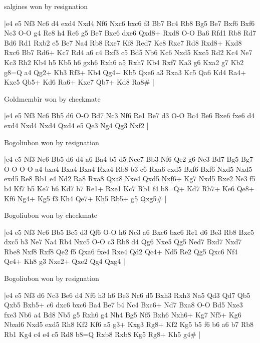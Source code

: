\showboard

salgines won by resignation

\makegametitle
|e4 e5 Nf3 Nc6 d4 exd4 Nxd4 Nf6 Nxc6 bxc6 f3 Bb7 Bc4 Rb8 Bg5 Be7 Bxf6 Bxf6 Nc3 O-O g4 Re8 h4 Re6 g5 Be7 Bxe6 dxe6 Qxd8+ Rxd8 O-O Ba6 Rfd1 Rb8 Rd7 Bd6 Rd1 Rxb2 e5 Be7 Na4 Rb8 Rxe7 Kf8 Red7 Ke8 Rxc7 Rd8 Rxd8+ Kxd8 Rxc6 Bb7 Rd6+ Kc7 Rd4 a6 c4 Bxf3 c5 Bd5 Nb6 Kc6 Nxd5 Kxc5 Rd2 Kc4 Ne7 Kc3 Rh2 Kb4 h5 Kb5 h6 gxh6 Rxh6 a5 Rxh7 Kb4 Rxf7 Ka3 g6 Kxa2 g7 Kb2 g8=Q a4 Qg2+ Kb3 Rf3+ Kb4 Qg4+ Kb5 Qxe6 a3 Rxa3 Kc5 Qa6 Kd4 Ra4+ Kxe5 Qb5+ Kd6 Ra6+ Kxe7 Qb7+ Kd8 Ra8\#  |

\showboard

Goldmembir won by checkmate

\makegametitle
|e4 e5 Nf3 Nc6 Bb5 d6 O-O Bd7 Nc3 Nf6 Re1 Be7 d3 O-O Bc4 Be6 Bxe6 fxe6 d4 exd4 Nxd4 Nxd4 Qxd4 e5 Qe3 Ng4 Qg3 Nxf2  |

\showboard

Bogoliubon won by resignation

\makegametitle
|e4 e5 Nf3 Nc6 Bb5 d6 d4 a6 Ba4 b5 d5 Nce7 Bb3 Nf6 Qe2 g6 Nc3 Bd7 Bg5 Bg7 O-O O-O a4 bxa4 Bxa4 Bxa4 Rxa4 Rb8 b3 c6 Rxa6 cxd5 Bxf6 Bxf6 Nxd5 Nxd5 exd5 Re8 Rb1 e4 Nd2 Ra8 Rxa8 Qxa8 Nxe4 Qxd5 Nxf6+ Kg7 Nxd5 Rxe2 Ne3 f5 b4 Kf7 b5 Ke7 b6 Kd7 b7 Re1+ Rxe1 Kc7 Rb1 f4 b8=Q+ Kd7 Rb7+ Ke6 Qe8+ Kf6 Ng4+ Kg5 f3 Kh4 Qe7+ Kh5 Rb5+ g5 Qxg5\#  |

\showboard

Bogoliubon won by checkmate

\makegametitle
|e4 e5 Nf3 Nc6 Bb5 Bc5 d3 Qf6 O-O h6 Nc3 a6 Bxc6 bxc6 Re1 d6 Be3 Rb8 Bxc5 dxc5 b3 Ne7 Na4 Rb4 Nxc5 O-O c3 Rb8 d4 Qg6 Nxe5 Qg5 Ned7 Bxd7 Nxd7 Rbe8 Nxf8 Rxf8 Qe2 f5 Qxa6 fxe4 Rxe4 Qd2 Qc4+ Nd5 Re2 Qg5 Qxc6 Nf4 Qc4+ Kh8 g3 Nxe2+ Qxe2 Qg4 Qxg4  |

\showboard

Bogoliubon won by resignation

\makegametitle
|e4 e5 Nf3 d6 Nc3 Be6 d4 Nf6 h3 h6 Be3 Nc6 d5 Bxh3 Rxh3 Na5 Qd3 Qd7 Qb5 Qxb5 Bxb5+ c6 dxc6 bxc6 Ba4 Be7 b4 Nc4 Bxc6+ Nd7 Bxa8 O-O Bd5 Nxe3 fxe3 Nb6 a4 Bd8 Nb5 g5 Rxh6 g4 Nh4 Bg5 Nf5 Bxh6 Nxh6+ Kg7 Nf5+ Kg6 Nbxd6 Nxd5 exd5 Rh8 Kf2 Kf6 a5 g3+ Kxg3 Rg8+ Kf2 Kg5 b5 f6 b6 a6 b7 Rb8 Rb1 Kg4 c4 e4 c5 Rd8 b8=Q Rxb8 Rxb8 Kg5 Rg8+ Kh5 g4\#  |

